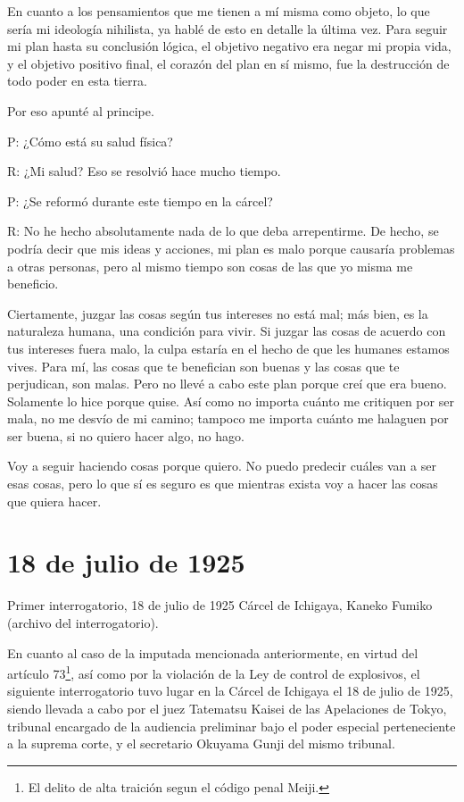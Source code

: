 \documentclass[
]{book}
\begin{document}
En cuanto a los pensamientos que me tienen a mí misma como objeto, lo que sería mi ideología nihilista, ya hablé de esto en detalle la última vez. Para seguir mi plan hasta su conclusión lógica, el objetivo negativo era negar mi propia vida, y el objetivo positivo final, el corazón del plan en sí mismo, fue la destrucción de todo poder en esta tierra.

Por eso apunté al principe.

P: ¿Cómo está su salud física?

R: ¿Mi salud? Eso se resolvió hace mucho tiempo.

P: ¿Se reformó durante este tiempo en la cárcel?

R: No he hecho absolutamente nada de lo que deba arrepentirme. De hecho, se podría decir que mis ideas y acciones, mi plan es malo porque causaría problemas a otras personas, pero al mismo tiempo son cosas de las que yo misma me beneficio.

Ciertamente, juzgar las cosas según tus intereses no está mal; más bien, es la naturaleza humana, una condición para vivir. Si juzgar las cosas de acuerdo con tus intereses fuera malo, la culpa estaría en el hecho de que les humanes estamos vives. Para mí, las cosas que te benefician son buenas y las cosas que te perjudican, son malas.
Pero no llevé a cabo este plan porque creí que era bueno. Solamente lo hice porque quise. Así como no importa cuánto me critiquen por ser mala, no me desvío de mi camino; tampoco me importa cuánto me halaguen por ser buena, si no quiero hacer algo, no hago.

Voy a seguir haciendo cosas porque quiero. No puedo predecir cuáles van a ser esas cosas, pero lo que sí es seguro es que mientras exista voy a hacer las cosas que quiera hacer.

\hypertarget{de-julio-de-1925}{%
\chapter*{18 de julio de 1925}\label{de-julio-de-1925}}

Primer interrogatorio, 18 de julio de 1925 Cárcel de Ichigaya, Kaneko Fumiko (archivo del interrogatorio).

En cuanto al caso de la imputada mencionada anteriormente, en virtud del artículo 73\footnote{El delito de alta traición segun el código penal Meiji.}, así como por la violación de la Ley de control de explosivos, el siguiente interrogatorio tuvo lugar en la Cárcel de Ichigaya el 18 de julio de 1925, siendo llevada a cabo por el juez Tatematsu Kaisei de las Apelaciones de Tokyo, tribunal encargado de la audiencia preliminar bajo el poder especial perteneciente a la suprema corte, y el secretario Okuyama Gunji del mismo tribunal.
\end{document}
